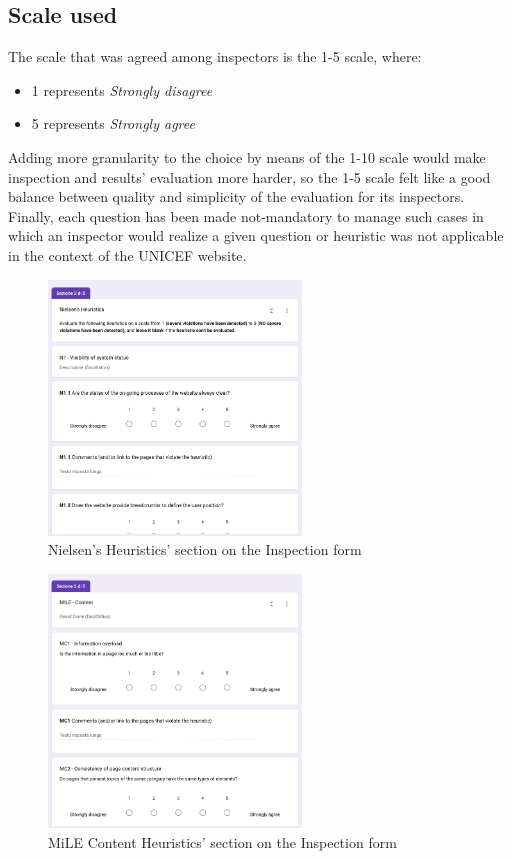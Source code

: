 \subsection{Scale used}
The scale that was agreed among inspectors is the 1-5 scale, where:
\begin{itemize}
	\item 1 represents \textit{Strongly disagree}
	\item 5 represents \textit{Strongly agree}
\end{itemize}
Adding more granularity to the choice by means of the 1-10 scale would make inspection and results' evaluation more harder, so the 1-5 scale felt like a good balance between quality and simplicity of the evaluation for its inspectors.
Finally, each question has been made not-mandatory to manage such cases in which an inspector would realize a given question or heuristic was not applicable in the context of the UNICEF website.

\begin{figure}[h]
	\centering
	\includegraphics[width=0.6\textwidth]{img/nielsen_heuristics_form.png}
	\caption{Nielsen's Heuristics' section on the Inspection form}
	\label{fig:nielsenForm}
\end{figure}

\begin{figure}[h]
	\centering
	\includegraphics[width=0.6\textwidth]{img/mile_content_form.png}
	\caption{MiLE Content Heuristics' section on the Inspection form}
	\label{fig:mileForm}
\end{figure}


